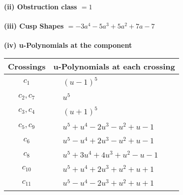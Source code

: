 \documentclass[1p]{elsarticle_modified}
\theoremstyle{definition}
\begin{document}
\flushleft \textbf{(ii) Obstruction class $= 1$}\\~\\
\flushleft \textbf{(iii) Cusp Shapes $= -3 a^4-5 a^3+5 a^2+7 a-7$}\\~\\
\newpage\renewcommand{\arraystretch}{1}
\flushleft \textbf{(iv) u-Polynomials at the component}\newline \\
\begin{tabular}{m{50pt}|m{274pt}}
Crossings & \hspace{64pt}u-Polynomials at each crossing \\
\hline $$\begin{aligned}c_{1}\end{aligned}$$&$\begin{aligned}
&(u-1)^5
\end{aligned}$\\
\hline $$\begin{aligned}c_{2},c_{7}\end{aligned}$$&$\begin{aligned}
&u^5
\end{aligned}$\\
\hline $$\begin{aligned}c_{3},c_{4}\end{aligned}$$&$\begin{aligned}
&(u+1)^5
\end{aligned}$\\
\hline $$\begin{aligned}c_{5},c_{9}\end{aligned}$$&$\begin{aligned}
&u^5+u^4-2 u^3- u^2+u-1
\end{aligned}$\\
\hline $$\begin{aligned}c_{6}\end{aligned}$$&$\begin{aligned}
&u^5- u^4+2 u^3- u^2+u-1
\end{aligned}$\\
\hline $$\begin{aligned}c_{8}\end{aligned}$$&$\begin{aligned}
&u^5+3 u^4+4 u^3+u^2- u-1
\end{aligned}$\\
\hline $$\begin{aligned}c_{10}\end{aligned}$$&$\begin{aligned}
&u^5+u^4+2 u^3+u^2+u+1
\end{aligned}$\\
\hline $$\begin{aligned}c_{11}\end{aligned}$$&$\begin{aligned}
&u^5- u^4-2 u^3+u^2+u+1
\end{aligned}$\\
\hline
\end{tabular}\\~\\
\end{document}
